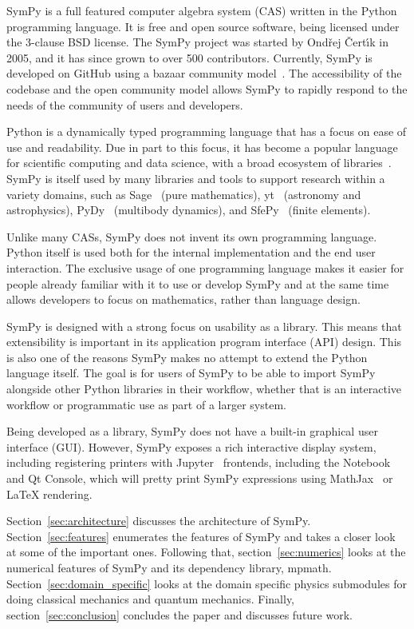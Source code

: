 SymPy is a full featured computer algebra system (CAS) written in the Python
programming language.
It is free and open source software, being licensed under the 3-clause BSD
license.
The SymPy project was started by Ond\v{r}ej \v{C}ert\'{\i}k in 2005, and it has
since grown to over 500 contributors. Currently, SymPy is
developed on GitHub using a bazaar community
model~\cite{raymond1999cathedral}. The accessibility of the codebase and the
open community model allows SymPy to rapidly respond to the needs of the
community of users and developers.

Python is a dynamically typed programming language that has a focus on
ease of use and readability. Due in part to this focus, it has become a popular
language for scientific
computing and data science, with a broad ecosystem of
libraries~\cite{oliphant2007python}. SymPy is itself used by many libraries
and tools to support research within a variety  domains, such as
Sage~\cite{SAGE} (pure mathematics),
yt~\cite{2011ApJS..192....9T} (astronomy and astrophysics),
PyDy~\cite{gede2013constrained} (multibody dynamics), and
SfePy~\cite{cimrman2014sfepy} (finite elements).

Unlike many CASs, SymPy does not invent its own programming language. Python
itself is used both for the internal implementation and the end user
interaction.  The exclusive usage of one programming language makes it easier
for people already familiar with it to use or develop SymPy and at the same
time allows developers to focus on mathematics, rather than language design.

SymPy is designed with a strong focus on usability as a library. This
means that extensibility is important in its application program interface
(API) design. This is also one of the reasons SymPy makes no attempt to extend
the Python language itself. The goal is for users of SymPy to be able to
import SymPy alongside other Python libraries in their workflow, whether that
is an interactive workflow or programmatic use as part of a larger system.

Being developed as a library, SymPy does not have a built-in graphical user
interface (GUI). However, SymPy exposes a rich interactive display system,
including registering printers with Jupyter~\cite{perez2007ipython} frontends,
including the Notebook and Qt Console, which will pretty print SymPy
expressions using MathJax~\cite{cervone2012mathjax} or \LaTeX{} rendering.

Section~\ref{sec:architecture} discusses the architecture of SymPy.
Section~\ref{sec:features} enumerates the features of SymPy and takes a closer
look at some of the important ones. Following that, section~\ref{sec:numerics}
looks at the numerical features of SymPy and its dependency library, mpmath.
Section~\ref{sec:domain_specific} looks at the domain specific physics
submodules for doing classical mechanics and quantum mechanics. Finally,
section~\ref{sec:conclusion} concludes the paper and discusses future work.
